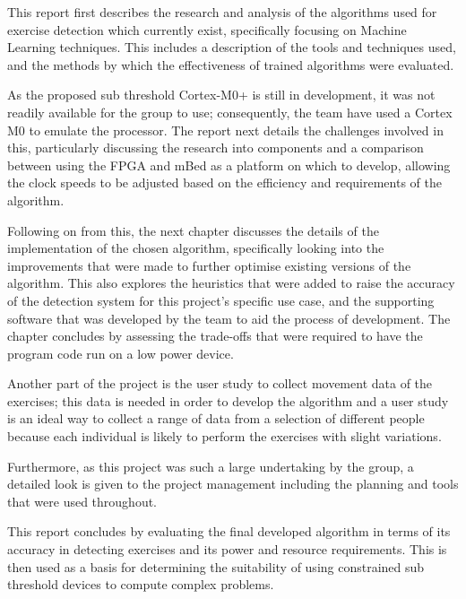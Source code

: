 
This report first describes the research and analysis of the algorithms used for exercise detection which currently exist, specifically focusing on Machine Learning techniques. This includes a description of the tools and techniques used, and the methods by which the effectiveness of trained algorithms were evaluated.

As the proposed sub threshold Cortex-M0+ is still in development, it was not readily available for the group to use; consequently, the team have used a Cortex M0 to emulate the processor. The report next details the challenges involved in this, particularly discussing the research into components and a comparison between using the FPGA and mBed as a platform on which to develop, allowing the clock speeds to be adjusted based on the efficiency and requirements of the algorithm.

Following on from this, the next chapter discusses the details of the implementation of the chosen algorithm, specifically looking into the improvements that were made to further optimise existing versions of the algorithm. This also explores the heuristics that were added to raise the accuracy of the detection system for this project's specific use case, and the supporting software that was developed by the team to aid the process of development. The chapter concludes by assessing the trade-offs that were required to have the program code run on a low power device.

Another part of the project is the user study to collect movement data of the exercises; this data is needed in order to develop the algorithm and a user study is an ideal way to collect a range of data from a selection of different people because each individual is likely to perform the exercises with slight variations.

Furthermore, as this project was such a large undertaking by the group, a detailed look is given to the project management including the planning and tools that were used throughout.

This report concludes by evaluating the final developed algorithm in terms of its accuracy in detecting exercises and its power and resource requirements. This is then used as a basis for determining the suitability of using constrained sub threshold devices to compute complex problems.


